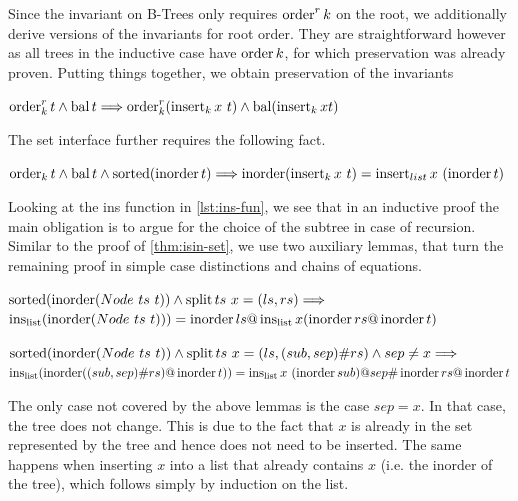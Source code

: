Since the invariant on B-Trees only requires $\operatorname{order}^r k$ on the
root, we additionally derive versions of the invariants
for root order.
They are straightforward however as all trees in the inductive case
have $\operatorname{order} k$, for which preservation was already proven.
Putting things together, we obtain preservation of the invariants

\begin{theorem}
    $\operatorname{order}^r_k t \wedge \operatorname{bal} t \Longrightarrow
    \operatorname{order}^r_k (\operatorname{insert}_k x\ t) \wedge \operatorname{bal} (\operatorname{insert}_k x t)$
\end{theorem}

The set interface further requires the following fact.
\begin{theorem}
    \label{thm:ins-set}
    $\operatorname{order}_k t \wedge \operatorname{bal} t \wedge \operatorname{sorted}  (\operatorname{inorder} t)\Longrightarrow
    \operatorname{inorder} (\operatorname{insert}_k x\ t) = \operatorname{insert}_{list} x\ (\operatorname{inorder} t)$
\end{theorem}

Looking at the ins function in \autoref{lst:ins-fun},
we see that in an inductive proof the main obligation
is to argue for the choice of the subtree in case of recursion.
Similar to the proof of \autoref{thm:isin-set},
we use two auxiliary lemmas, that turn the remaining
proof in simple case distinctions and chains of equations.

\begin{lemma}
    $\operatorname{sorted}(\operatorname{inorder} (Node\ ts\ t)) \wedge \operatorname{split} ts\ x = (ls, rs) \Longrightarrow$ \\
    $\operatorname{ins_{list}} (\operatorname{inorder} (Node\ ts\ t))) = \operatorname{inorder} ls @ \operatorname{ins_{list}} x (\operatorname{inorder} rs @ \operatorname{inorder} t)$
\end{lemma}

\begin{lemma}
    $\operatorname{sorted} (\operatorname{inorder} (Node\ ts\ t)) \wedge \operatorname{split} ts\ x = (ls, (sub,sep)\#rs) \wedge sep \neq x \Longrightarrow$ \\
    $\operatorname{ins_{list}} (\operatorname{inorder} ((sub,sep)\#rs) @ \operatorname{inorder} t)) = \operatorname{ins_{list}} x\ (\operatorname{inorder} sub) @ sep \# \operatorname{inorder} rs @ \operatorname{inorder} t$
\end{lemma}

The only case not covered by the above lemmas is the case $sep = x$.
In that case, the tree does not change.
This is due to the fact that $x$ is already in the set represented by the tree
and hence does not need to be inserted.
The same happens when inserting $x$ into a list that already contains $x$
(i.e. the inorder of the tree),
which follows simply by induction on the list.

